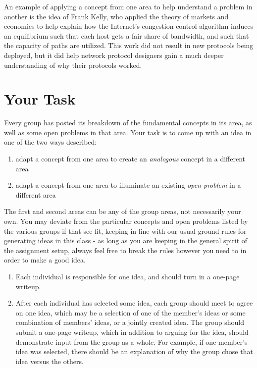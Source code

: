 \documentclass[11pt]{article}
\begin{document}
An example of applying a concept from one area to help understand a
problem in another is the idea of Frank Kelly, who applied the theory
of markets and economics to help explain how the Internet's congestion
control algorithm induces an equilibrium such that each host gets a
fair share of bandwidth, and such that the capacity of paths are
utilized.  This work did not result in new protocols being deployed,
but it did help network protocol designers gain a much deeper
understanding of why their protocols worked.

\section{Your Task}

Every group has posted its breakdown of the fundamental concepts in 
its area, as well as some open problems in that area.  
Your task is to come up with an idea in one of the two ways
described:
\begin{enumerate}
\itemsep=-1pt
\item adapt a concept from one area to 
create an {\it analogous} concept in a different area
\item adapt a concept from one area to 
illuminate an existing {\it open problem} in a different area
\end{enumerate}
The first and second areas can be any of the group areas, not
necessarily your own.  You may deviate from the particular concepts
and open problems listed by the various groups if that see fit,
keeping in line with our usual ground rules for generating ideas in
this class - as long as you are keeping in the general spirit of the
assignment setup, always feel free to break the rules however you need to 
in order to make a good idea.

\begin{enumerate}
\itemsep=-1pt
\item Each individual is responsible for one idea, and should 
      turn in a one-page writeup.
\item After each individual has selected some idea, each group should
  meet to agree on one idea, which may be a selection of one of the member's
  ideas or some combination of members' ideas, or a jointly created idea.  
  The group should submit a
  one-page writeup, which in addition to arguing for the idea, should 
  demonstrate input from the group as a whole.  For example, if one member's
  idea was selected, there should be an 
  explanation of why the group chose that idea versus the others.
\end{enumerate}
\end{document}
